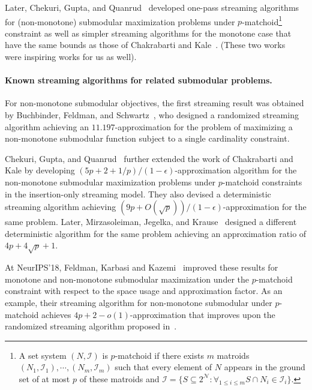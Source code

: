 \documentclass[11pt]{article}
\begin{document}
Later, Chekuri, Gupta, and Quanrud~\cite{DBLP:conf/icalp/ChekuriGQ15} 
developed one-pass streaming algorithms for 
(non-monotone)  submodular maximization problems under $p$-matchoid\footnote{A set system $(N,\mathcal{I})$ 
is $p$-matchoid if there exists $m$ matroids $(N_1,\mathcal{I}_1),\cdots,(N_m,\mathcal{I}_m)$ 
such that every element of $N$ appears in the ground set of at
most $p$ of these matroids and $\mathcal{I} = \{S \subseteq 2^{\mathcal{N}}: \forall_{1 \le i \le m} S \cap N_i \in \mathcal{I}_i\}$.} constraint as well as simpler 
streaming algorithms for the monotone case that have the same bounds as 
those of Chakrabarti and Kale~\cite{chakrabarti2015submodular}. 
(These two works~\cite{chakrabarti2015submodular,DBLP:conf/icalp/ChekuriGQ15} were inspiring works for us as well). 

\paragraph{Known streaming algorithms for related submodular problems.} 
For non-monotone submodular objectives, the first streaming result was obtained by
Buchbinder, Feldman, and Schwartz~\cite{DBLP:conf/soda/BuchbinderFS15a}, 
who designed a randomized streaming algorithm achieving an $11.197$-approximation 
for the problem of maximizing a non-monotone submodular function subject
to a single cardinality constraint.

Chekuri, Gupta, and Quanrud~\cite{DBLP:conf/icalp/ChekuriGQ15} further extended the work of Chakrabarti and Kale by developing  
$(5p+2+1/p)/(1-\epsilon)$-approximation algorithm for 
the non-monotone submodular maximization problems under $p$-matchoid constraints in the insertion-only streaming model. 
They also devised a deterministic streaming algorithm achieving $(9p+O(\sqrt{p}))/(1-\epsilon)$-approximation for the same problem. 
Later, Mirzasoleiman, Jegelka, and Krause~\cite{DBLP:conf/aaai/MirzasoleimanJ018} designed a different deterministic algorithm for 
the same problem achieving an approximation ratio of $4p+4\sqrt{p}+1$.

At NeurIPS'18, Feldman, Karbasi and Kazemi~\cite{DBLP:conf/nips/FeldmanK018} improved these results 
for monotone and non-monotone submodular maximization under the $p$-matchoid constraint 
with respect to the space usage and approximation factor. 
As an example, their streaming algorithm for non-monotone submodular under $p$-matchoid 
achieves $4p+2-o(1)$-approximation that improves upon the randomized 
streaming algorithm proposed in~\cite{DBLP:conf/icalp/ChekuriGQ15}. 
\end{document}
